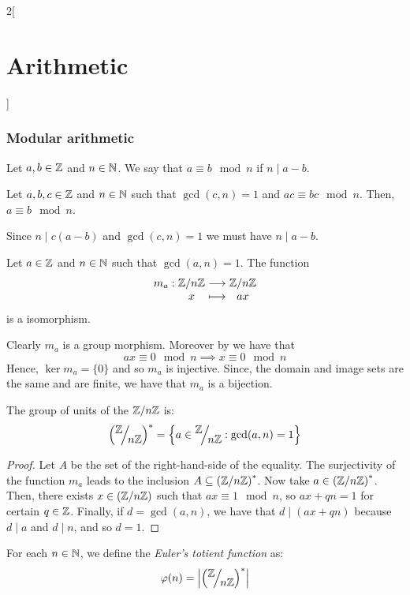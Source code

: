 \documentclass[../../../main_math.tex]{subfiles}
\begin{document}
\begin{multicols}{2}[\section{Arithmetic}]
  \subsubsection{Modular arithmetic}
  \begin{definition}
    Let $a,b\in\mathbb{Z}$ and $n\in\mathbb{N}$. We say that $a\equiv b\mod n$ if $n\mid a-b$.
  \end{definition}
  \begin{proposition}
    Let $a,b,c\in\mathbb{Z}$ and $n\in\mathbb{N}$ such that $\gcd(c,n)=1$ and $ac\equiv bc\mod n$. Then, $a\equiv b\mod n$.
  \end{proposition}
  \begin{sproof}
    Since $n\mid c(a-b)$ and $\gcd(c,n)=1$ we must have $n\mid a-b$.
  \end{sproof}
  \begin{proposition}\label{A:cancellity}
    Let $a\in\mathbb{Z}$ and $n\in\mathbb{N}$ such that $\gcd(a,n)=1$. The function $$\function{m_a}{\quot{\ZZ}{n\ZZ}}{\quot{\ZZ}{n\ZZ}}{x}{ax}$$ is a isomorphism.
  \end{proposition}
  \begin{sproof}
    Clearly $m_a$ is a group morphism. Moreover by  we have that $$ax\equiv 0 \mod n\implies x\equiv 0\mod n$$
    Hence, $\ker m_a=\{0\}$ and so $m_a$ is injective. Since, the domain and image sets are the same and are finite, we have that $m_a$ is a bijection.
  \end{sproof}
  \begin{corollary}\label{A:multgroupunits}
    The group of units of the $\quot{\ZZ}{n\ZZ}$ is: $${\left(\quot{\ZZ}{n\ZZ}\right)}^*=\left\{a\in\quot{\ZZ}{n\ZZ}:\gcd(a,n)=1\right\}$$
  \end{corollary}
  \begin{proof}
    Let $A$ be the set of the right-hand-side of the equality. The surjectivity of the function $m_a$ leads to the inclusion $A\subseteq {\left(\quot{\ZZ}{n\ZZ}\right)}^*$. Now take $a\in{\left(\quot{\ZZ}{n\ZZ}\right)}^*$. Then, there exists $x\in\left(\quot{\ZZ}{n\ZZ}\right)$ such that $ax\equiv 1\mod n$, so $ax+qn=1$ for certain $q\in\mathbb{Z}$. Finally, if $d=\gcd(a,n)$, we have that $d\mid (ax+qn)$ because $d\mid a$ and $d\mid n$, and so $d=1$.
  \end{proof}
  \begin{definition}
    For each $n\in\mathbb{N}$, we define the \emph{Euler's totient function} as: $$\varphi(n)=\left|{\left(\quot{\ZZ}{n\ZZ}\right)}^*\right|$$
  \end{definition}
  \begin{proposition}

\end{proposition}
\end{multicols}
\end{document}

